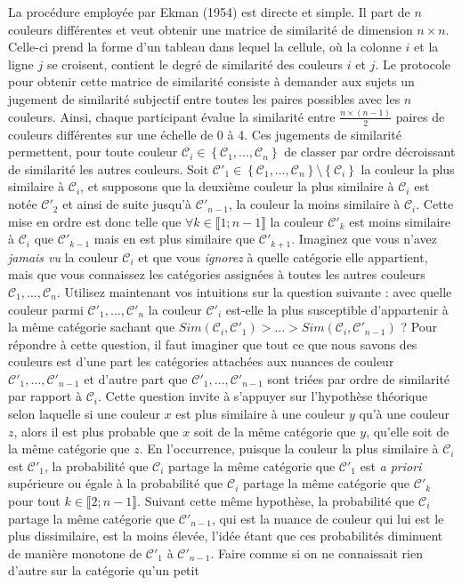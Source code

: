 \documentclass{article}
\begin{document}
La procédure employée par Ekman (1954) est directe et simple. Il part de $n$ couleurs différentes et veut obtenir une matrice de similarité de dimension $n\times n$. Celle-ci prend la forme d’un tableau dans lequel la cellule, où la colonne $i$ et la ligne $j$ se croisent, contient le degré de similarité des couleurs $i$ et $j$. Le protocole pour obtenir cette matrice de similarité consiste à demander aux sujets un jugement de similarité subjectif entre toutes les paires possibles avec les $n$ couleurs. Ainsi, chaque participant évalue la similarité entre $\frac{n\times\left(n-1\right)}{2}$ paires de couleurs différentes sur une échelle de 0 à 4. Ces jugements de similarité permettent, pour toute couleur $\mathcal{C}_i\in\left\{\mathcal{C}_1,\ldots,\mathcal{C}_n\right\}$ de classer par ordre décroissant de similarité les autres couleurs. Soit ${\mathcal{C'}}_1\in\left\{\mathcal{C}_1,\ldots,\mathcal{C}_n\right\}\setminus\left\{\mathcal{C}_i\right\}$ la couleur la plus similaire à $\mathcal{C}_i$, et supposons que la deuxième couleur la plus similaire à $\mathcal{C}_i$ est notée ${\mathcal{C'}}_2$ et ainsi de suite jusqu’à ${\mathcal{C'}}_{n-1}$, la couleur la moins similaire à $\mathcal{C}_i$. Cette mise en ordre est donc telle que $\forall k\in\llbracket 1 ; n-1 \rrbracket$ la couleur $\mathcal{C'}_k$ est moins similaire à $\mathcal{C}_i$ que $\mathcal{C'}_{k-1}$ mais en est plus similaire que $\mathcal{C'}_{k+1}$. Imaginez que vous n’avez \textit{jamais vu} la couleur $\mathcal{C}_i$ et que vous \textit{ignorez} à quelle catégorie elle appartient, mais que vous connaissez les catégories assignées à toutes les autres couleurs $\mathcal{C}_1,\ldots,\mathcal{C}_n$. Utilisez maintenant vos intuitions sur la question suivante : avec quelle couleur parmi  $\mathcal{C'}_1,\ldots,\mathcal{C'}_n$ la couleur $\mathcal{C'}_i$ est-elle la plus susceptible d’appartenir à la même catégorie sachant que $Sim(\mathcal{C}_i, \mathcal{C'}_1)>\ldots>Sim(\mathcal{C}_i, \mathcal{C'}_{n-1})$ ? Pour répondre à cette question, il faut imaginer que tout ce que nous savons des couleurs est d’une part les catégories attachées aux nuances de couleur $\mathcal{C'}_1,\ldots,\mathcal{C'}_{n-1}$ et d’autre part que $\mathcal{C'}_1,\ldots,\mathcal{C'}_{n-1}$ sont triées par ordre de similarité par rapport à $\mathcal{C}_i$. Cette question invite à s’appuyer sur l’hypothèse théorique selon laquelle si une couleur $x$ est plus similaire à une couleur $y$ qu’à une couleur $z$, alors il est plus probable que $x$ soit de la même catégorie que $y$, qu’elle soit de la même catégorie que $z$. En l’occurrence, puisque la couleur la plus similaire à $\mathcal{C}_i$ est $\mathcal{C'}_1$, la probabilité que $\mathcal{C}_i$ partage la même catégorie que $\mathcal{C'}_1$ est \textit{a priori} supérieure ou égale à la probabilité que $\mathcal{C}_i$ partage la même catégorie que $\mathcal{C'}_k$ pour tout $k\in\llbracket 2 ; n-1 \rrbracket$. Suivant cette même hypothèse, la probabilité que $\mathcal{C}_i$ partage la même catégorie que $\mathcal{C'}_{n-1}$, qui est la nuance de couleur qui lui est le plus dissimilaire, est la moins élevée, l’idée étant que ces probabilités diminuent de manière monotone de $\mathcal{C'}_1$ à $\mathcal{C'}_{n-1}$. Faire comme si on ne connaissait rien d’autre sur la catégorie qu’un petit 
\end{document}
